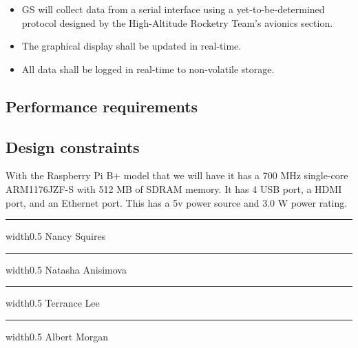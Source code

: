 \documentclass[10pt,journal,draftclsnofoot,onecolumn]{IEEEtran}
\newcommand{\sigline}[1][\empty] {
	\vspace{1in}
	\hrule width0.5\textwidth
	\vspace{1mm}
	\noindent #1	
}
\begin{document}
	\begin{itemize}
		\item GS will collect data from a serial interface using a yet-to-be-determined protocol designed by the High-Altitude Rocketry Team's avionics section.
		\item The graphical display shall be updated in real-time.
		\item All data shall be logged in real-time to non-volatile storage.






	\end{itemize}
	
	\subsection{Performance requirements}
	\subsection{Design constraints}
	With the Raspberry Pi B+ model that we will have it has a 700 MHz single-core ARM1176JZF-S with 512 MB of SDRAM memory.  It has 4 USB port, a HDMI port, and an Ethernet port.  This has a 5v power source and 3.0 W power rating.

	
	
	\begin{minipage}{\textwidth}
	
	\sigline{Nancy Squires}
	\sigline{Natasha Anisimova}
	\sigline{Terrance Lee}
	\sigline{Albert Morgan}\\
	
\end{minipage}
\end{document}
